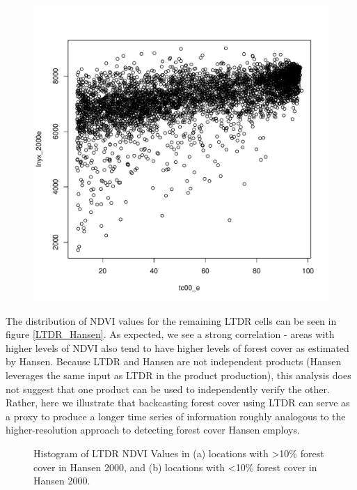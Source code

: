 \documentclass{article}\usepackage[]{graphicx}\usepackage[]{color}
\newenvironment{knitrout}{}{}  %
\begin{document}
\begin{knitrout}
\begin{figure}[H]
\begin{Schunk}
\includegraphics[width=0.8\linewidth]{figure/LTDR_NDVI-1} \end{Schunk}
\end{figure}
The distribution of NDVI values for the remaining LTDR cells can be seen in figure \ref{LTDR_Hansen}.  
As expected, we see a strong correlation - areas with higher levels of NDVI also tend to have higher levels of forest cover as estimated by Hansen.  
Because LTDR and Hansen are not independent products (Hansen leverages the same input as LTDR in the product production), this analysis does not suggest that one product can be used to independently verify the other.  
Rather, here we illustrate that backcasting forest cover using LTDR can serve as a proxy to produce a longer time series of information roughly analogous to the higher-resolution approach to detecting forest cover Hansen employs.
\begin{figure}[H]
\caption{Histogram of LTDR NDVI Values in (a) locations with >10\% forest cover in Hansen 2000, and (b) locations with <10\% forest cover in Hansen 2000.}
\label{NDVI_Hansen_hist}
\centering
\begin{Schunk}


\end{Schunk}
\end{figure}
\end{knitrout}
\end{document}

